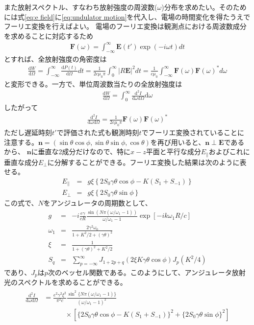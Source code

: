 \documentclass[a4paper,11pt,uplatex]{jsbook}
\begin{document}
また放射スペクトル、すなわち放射強度の周波数($\omega$)分布を求めたい。そのためには式\ref{eq:e field}に\ref{eq:undulator motion}を代入し、電場の時間変化を得たうえでフーリエ変換を行えばよい。
電場のフーリエ変換は観測点における周波数成分を求めることに対応するため
\begin{eqnarray}
  \bm{F}(\omega) = \int_{-\infty}^{\infty} \bm{E}(t')\exp(-i\omega t)dt
\end{eqnarray}
とすれば、全放射強度の角密度は
\begin{eqnarray}
  \frac{\text{d}W}{\text{d}\Omega} = \int_{-\infty}^{\infty} \frac{\text{d}P(t)}{\text{d}\Omega}dt = \frac{1}{2c\mu_0\pi}\int_{0}^{\infty} \left|R\bm{E}\right|^2 dt 
  = \frac{1}{c\mu_0}\int_{-\infty}^{\infty} \bm{F}(\omega)\bm{F}(\omega)^*d\omega
\end{eqnarray}
と変形できる。一方で、単位周波数当たりの全放射強度は
\begin{eqnarray}
  \frac{\text{d}W}{\text{d}\Omega} = \int_{0}^{\infty}\frac{\text{d}^2I}{\text{d}\omega \text{d}\Omega}\text{d}\omega
\end{eqnarray}
したがって
\begin{eqnarray}
  \frac{\text{d}^2I}{\text{d}\omega \text{d}\Omega} = \frac{1}{2c\mu_0\pi}\bm{F}(\omega)\bm{F}(\omega)^*
\end{eqnarray}
ただし遅延時刻$t'$で評価された式も観測時刻$t$でフーリエ変換されていることに注意する。$\bm{n} =(\sin\theta\cos\phi,\sin\theta\sin\phi,\cos\theta)$を再び用いると、$\bm{n}\perp\bm{E}$であるから、
$\bm{n}$に垂直な2成分だけなので、特に$x-z$平面と平行な成分$E_{\parallel}$およびこれに垂直な成分$E_{\perp}$に分解することができる。フーリエ変換した結果は次のように表せる。
\begin{eqnarray}
  E_\parallel &=& g\xi\left\{2S_0\gamma \theta \cos\phi - K (S_1 + S_{-1})\right\}\\
  E_\perp &=& g\xi\left\{2S_0\gamma \theta \sin \phi\right\}
\end{eqnarray}
この式で、$N$をアンジュレータの周期数として、
\begin{eqnarray}
  g &=& -i \frac{e\gamma}{cR} \frac{\sin \left( N\pi (\omega/\omega_1 -1) \right)}{\omega/\omega_1 -1}\exp\left[-ik\omega_1 R/c \right]\\
  \omega_1 &=& \frac{2\gamma^2\omega_0}{1+K^2/2 + (\gamma\theta)^2} \label{resonance_wl}\\
  \xi &=& \frac{1}{1 + (\gamma\theta)^2 + K^2/2} \\
  S_q &=& \sum_{p = -\infty}^{\infty} J_{1+2p+q}(2\xi K\gamma\theta\cos\phi)J_p(K^2/4)
\end{eqnarray}
であり、$J_p$は$p$次のベッセル関数である。このようにして、アンジュレータ放射光のスペクトルを求めることができる。
\begin{eqnarray}\label{eq:spectrum}
  \begin{split}
   \frac{\text{d}^2I}{\text{d}\omega \text{d}\Omega} &= \frac{e^2\gamma^2\xi^2}{\pi^2 c}\frac{\sin^2 \{N\pi(\omega/\omega_1 -1)\}}{(\omega/\omega_1 -1)^2}\\
   &~~~~~~~~~~~~~~\times\left[ \{2S_0\gamma\theta\cos\phi - K(S_1 + S_{-1})\}^2 + \{2S_0\gamma \theta \sin \phi\}^2 \right]
  \end{split}
\end{eqnarray}
\end{document}
